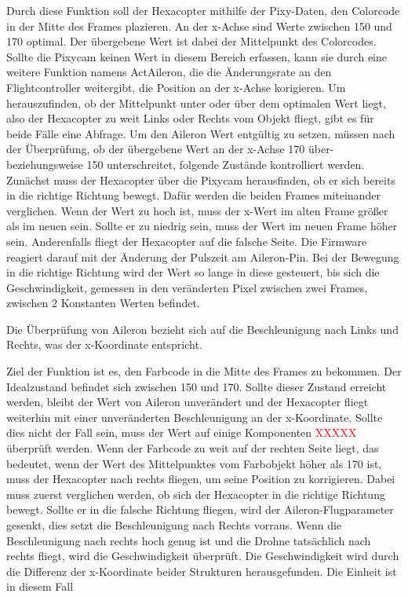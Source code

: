     Durch diese Funktion soll der Hexacopter mithilfe der Pixy-Daten, den Colorcode in der Mitte des Frames plazieren. An der x-Achse sind Werte zwischen 150 und 170 optimal. Der übergebene Wert ist dabei der Mittelpunkt des Colorcodes. 
    Sollte die Pixycam keinen Wert in diesem Bereich erfassen, kann sie durch eine weitere Funktion namens ActAileron, die die Änderungsrate an den Flightcontroller weitergibt, die Position an der x-Achse korigieren.
    Um herauszufinden, ob der Mittelpunkt unter oder über dem optimalen Wert liegt, also der Hexacopter zu weit Links oder Rechts vom Objekt fliegt, gibt es für beide Fälle eine Abfrage.
    Um den Aileron Wert entgültig zu setzen, müssen nach der Überprüfung, ob der übergebene Wert an der x-Achse 170 über- beziehungsweise 150 unterschreitet, folgende Zustände kontrolliert werden.
    Zunächst muss der Hexacopter über die Pixycam herausfinden, ob er sich bereits in die richtige Richtung bewegt. Dafür werden die beiden Frames miteinander verglichen. Wenn der Wert zu hoch ist, muss der x-Wert im alten Frame größer als im neuen sein. Sollte er zu niedrig sein, muss der Wert im neuen Frame höher sein.
    Anderenfalls fliegt der Hexacopter auf die falsche Seite. Die Firmware reagiert darauf mit der Änderung der Pulszeit am Aileron-Pin.
    Bei der Bewegung in die richtige Richtung wird der Wert so lange in diese gesteuert, bis sich die Geschwindigkeit, gemessen in den veränderten Pixel zwischen zwei Frames, zwischen 2 Konstanten Werten befindet.


    Die Überprüfung von Aileron bezieht sich auf die Beschleunigung nach Links und Rechts, was der x-Koordinate entspricht.

    Ziel der Funktion ist es, den Farbcode in die Mitte des Frames zu bekommen. Der Idealzustand befindet sich zwischen 150 und 170.
    Sollte dieser Zustand erreicht werden, bleibt der Wert von Aileron unverändert und der Hexacopter fliegt weiterhin mit einer unveränderten Beschleunigung an der x-Koordinate.
    Sollte dies nicht der Fall sein, muss der Wert auf einige Komponenten \textcolor{red}{XXXXX} überprüft werden.
    Wenn der Farbcode zu weit auf der rechten Seite liegt, das bedeutet, wenn der Wert des Mittelpunktes vom Farbobjekt höher als 170 ist,
    muss der Hexacopter nach rechts fliegen, um seine Position zu korrigieren.
    Dabei muss zuerst verglichen werden, ob sich der Hexacopter in die richtige Richtung bewegt. Sollte er in die falsche Richtung
    fliegen, wird der Aileron-Flugparameter gesenkt, dies setzt die Beschleunigung nach Rechts vorraus.
    Wenn die Beschleunigung nach rechts hoch genug ist und die Drohne tatsächlich nach rechts fliegt, wird die Geschwindigkeit überprüft.
    Die Geschwindigkeit wird durch die Differenz der x-Koordinate beider Strukturen herausgefunden. Die Einheit ist in diesem Fall

